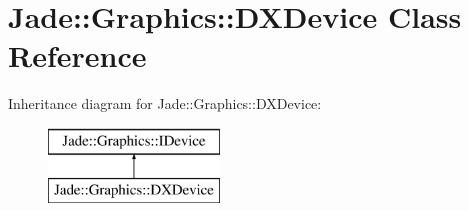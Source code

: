 \hypertarget{class_jade_1_1_graphics_1_1_d_x_device}{}\section{Jade\+:\+:Graphics\+:\+:D\+X\+Device Class Reference}
\label{class_jade_1_1_graphics_1_1_d_x_device}
Inheritance diagram for Jade\+:\+:Graphics\+:\+:D\+X\+Device\+:\begin{figure}[H]
\begin{center}
\leavevmode
\includegraphics[height=2.000000cm]{class_jade_1_1_graphics_1_1_d_x_device}
\end{center}
\end{figure}
